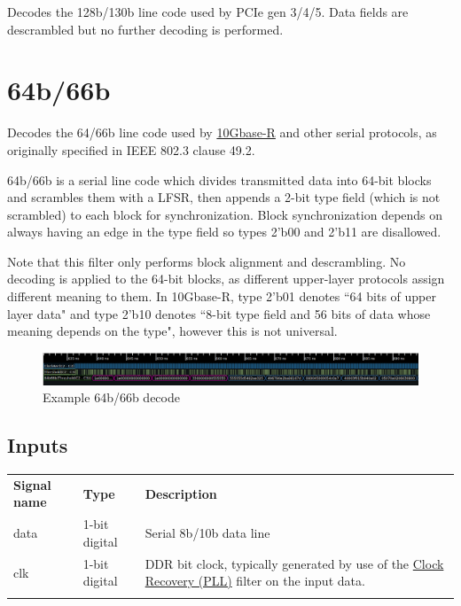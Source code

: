 Decodes the 128b/130b line code used by PCIe gen 3/4/5. Data fields are descrambled but no further decoding is
performed.

\pagebreak
\section{64b/66b}
\label{filter:64b66b}

Decodes the 64/66b line code used by \hyperref[filter:10gbaser]{10Gbase-R} and other serial protocols, as originally
specified in IEEE 802.3 clause 49.2.

64b/66b is a serial line code which divides transmitted data into 64-bit blocks and scrambles them with a LFSR, then
appends a 2-bit type field (which is not scrambled) to each block for synchronization. Block synchronization depends on
always having an edge in the type field so types 2'b00 and 2'b11 are disallowed.

Note that this filter only performs block alignment and descrambling. No decoding is applied to the 64-bit blocks, as
different upper-layer protocols assign different meaning to them. In 10Gbase-R, type 2'b01 denotes ``64 bits of upper
layer data" and type 2'b10 denotes ``8-bit type field and 56 bits of data whose meaning depends on the type", however
this is not universal.

\begin{figure}[h]
\centering
\includegraphics[width=16cm]{images/filters/64b66b.png}
\caption{Example 64b/66b decode}
\label{filter_64b66b}
\end{figure}

\subsection{Inputs}

\begin{tabularx}{16cm}{llX}
\thickhline
\textbf{Signal name} & \textbf{Type} & \textbf{Description} \\
\thickhline
data & 1-bit digital & Serial 8b/10b data line \\
\thickhline
clk & 1-bit digital & DDR bit clock, typically generated by use of the \hyperref[filter:cdrpll]{Clock Recovery
(PLL)} filter on the input data.\\
\thickhline
\end{tabularx}

